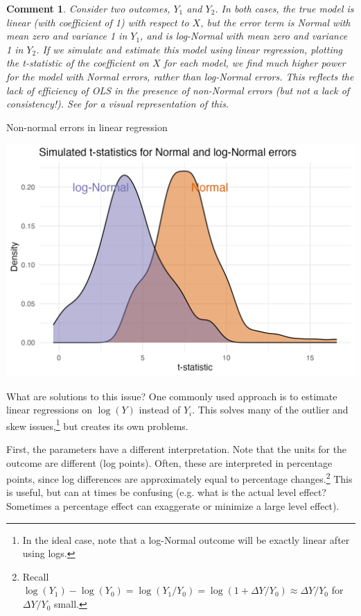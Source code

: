 \documentclass{tufte-handout}
\theoremstyle{break}
\newtheorem{cmt}{Comment}
\begin{document}
\begin{boxF}
\begin{cmt}
  Consider two outcomes, $Y_{1}$ and $Y_{2}$. In both cases, the true model is linear (with coefficient of 1) with respect to $X$, but the error term is Normal with mean zero and variance 1 in $Y_{1}$, and is log-Normal with mean zero and variance 1 in $Y_{2}$. If we simulate and estimate this model using linear regression, plotting the t-statistic of the coefficient on $X$ for each model, we find much higher power for the model with Normal errors, rather than log-Normal errors. This reflects the lack of efficiency of OLS in the presence of non-Normal errors (but not a lack of consistency!). See  for a visual representation of this.
\end{cmt}
\end{boxF}

\begin{marginfigure}
  \caption{Non-normal errors in linear regression}
  \label{fig:non_normal_errors}
  \includegraphics[width=\linewidth]{note_code_9.png}
\end{marginfigure}

What are solutions to this issue? One commonly used approach is to estimate linear regressions on $\log(Y)$ instead of $Y_{i}$. This solves many of the outlier and skew issues,\footnote{In the ideal case, note that a log-Normal outcome will be exactly linear after using logs.} but creates its own problems. 

First, the parameters have a different interpretation. Note that the units for the outcome are different (log points). Often, these are interpreted in percentage points, since log differences are approximately equal to percentage changes.\footnote{Recall $\log(Y_{1}) - \log(Y_{0}) = \log(Y_{1}/Y_{0}) = \log(1+\Delta Y / Y_{0}) \approx \Delta Y / Y_{0}$ for $\Delta Y / Y_{0}$ small.  } This is useful, but can at times be confusing (e.g. what is the actual level effect? Sometimes a percentage effect can exaggerate or minimize a large level effect). 
\end{document}
